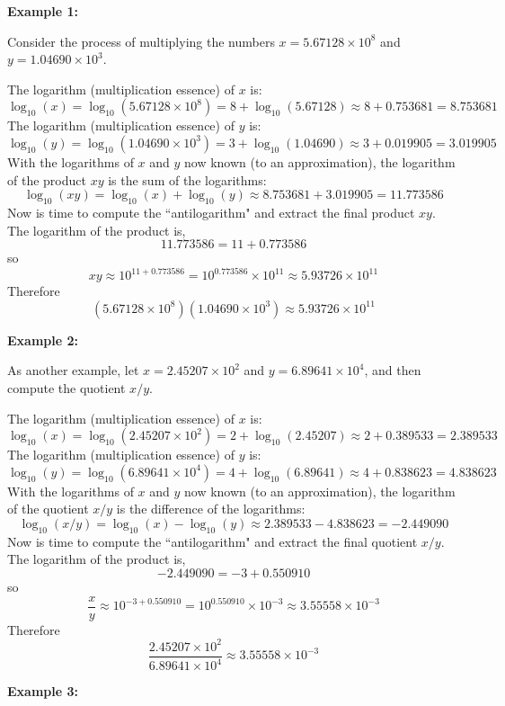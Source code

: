 \documentclass{article}
\begin{document}
\vspace{5mm}

\textbf{Example 1:}

Consider the process of multiplying the numbers \(x = 5.67128 \times 10^8\) and \(y = 1.04690 \times 10^3\). 

The logarithm (multiplication essence) of \(x\) is: 
\[\log_{10}(x) = \log_{10}(5.67128 \times 10^8) = 8 + \log_{10}(5.67128) \approx 8 + 0.753681 = 8.753681\]
The logarithm (multiplication essence) of \(y\) is:
\[\log_{10}(y) = \log_{10}(1.04690 \times 10^3) = 3 + \log_{10}(1.04690) \approx 3 + 0.019905 = 3.019905\]
With the logarithms of \(x\) and \(y\) now known (to an approximation), the logarithm of the product \(xy\) is the sum of the logarithms:
\[\log_{10}(xy) = \log_{10}(x) + \log_{10}(y) \approx 8.753681 + 3.019905 = 11.773586\]
Now is time to compute the ``antilogarithm" and extract the final product \(xy\). The logarithm of the product is, 
\[11.773586 = 11 + 0.773586\]
so
\[xy \approx 10^{11 + 0.773586} = 10^{0.773586} \times 10^{11} \approx 5.93726 \times 10^{11}\]
Therefore
\[(5.67128 \times 10^8)(1.04690 \times 10^3) \approx 5.93726 \times 10^{11}\]

\vspace{5mm}

\textbf{Example 2:}

As another example, let \(x = 2.45207 \times 10^2\) and \(y = 6.89641 \times 10^4\), and then compute the quotient \(x/y\). 

The logarithm (multiplication essence) of \(x\) is: 
\[\log_{10}(x) = \log_{10}(2.45207 \times 10^2) = 2 + \log_{10}(2.45207) \approx 2 + 0.389533 = 2.389533\]
The logarithm (multiplication essence) of \(y\) is: 
\[\log_{10}(y) = \log_{10}(6.89641 \times 10^4) = 4 + \log_{10}(6.89641) \approx 4 + 0.838623 = 4.838623\]
With the logarithms of \(x\) and \(y\) now known (to an approximation), the logarithm of the quotient \(x/y\) is the difference of the logarithms:
\[\log_{10}(x/y) = \log_{10}(x) - \log_{10}(y) \approx 2.389533 - 4.838623 = -2.449090\]
Now is time to compute the ``antilogarithm" and extract the final quotient \(x/y\). The logarithm of the product is, 
\[-2.449090 = -3 + 0.550910\]
so
\[\frac{x}{y} \approx 10^{-3 + 0.550910} = 10^{0.550910} \times 10^{-3} \approx 3.55558 \times 10^{-3}\]
Therefore
\[\frac{2.45207 \times 10^2}{6.89641 \times 10^4} \approx 3.55558 \times 10^{-3}\]

\vspace{5mm}

\textbf{Example 3:}
\end{document}
